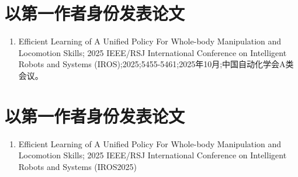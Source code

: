 \cleardoublepage
{}

{%
    \section*{以第一作者身份发表论文}
    \begin{enumerate}
        \item Efficient Learning of A Unified Policy For Whole-body Manipulation and Locomotion Skills; 2025 IEEE/RSJ International Conference on Intelligent Robots and Systems (IROS);2025;5455-5461;2025年10月;中国自动化学会A类会议。
    \end{enumerate}
}
{
    \section*{以第一作者身份发表论文}
    \begin{enumerate}
        \item Efficient Learning of A Unified Policy For Whole-body Manipulation and Locomotion Skills; 2025 IEEE/RSJ International Conference on Intelligent Robots and Systems (IROS2025)
    \end{enumerate}
}
